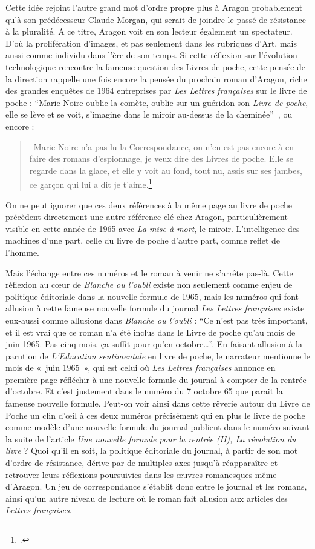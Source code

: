 	Cette idée rejoint l’autre grand mot d’ordre propre plus à Aragon probablement qu’à son prédécesseur Claude Morgan, qui serait de joindre le passé de résistance à la pluralité. A ce titre, Aragon voit en son lecteur également un spectateur. D’où la prolifération d’images, et pas seulement dans les rubriques d’Art, mais aussi comme individu dans l’ère de son temps. Si cette réflexion sur l’évolution technologique rencontre la fameuse question des Livres de poche, cette pensée de la direction rappelle une fois encore la pensée du prochain roman d’Aragon, riche des grandes enquêtes de 1964 entreprises par \emph{Les Lettres françaises} sur le livre de poche : \enquote{Marie Noire oublie la comète, oublie sur un guéridon son \emph{Livre de poche}, elle se lève et se voit, s’imagine dans le miroir au-dessus de la cheminée} , ou encore :
	\begin{quote}
	 Marie Noire n’a pas lu la Correspondance, on n’en est pas encore à en faire des romans d’espionnage, je veux dire des Livres de poche. Elle se regarde dans la glace, et elle y voit au fond, tout nu, assis sur ses jambes, ce garçon qui lui a dit je t’aime.\footcite[p102]{blancheouloubli}\end{quote}

	  On ne peut ignorer que ces deux références à la même page au livre de poche précèdent directement une autre référence-clé chez Aragon, particulièrement visible en cette année de 1965 avec \emph{La mise à mort}, le miroir. L’intelligence des machines d’une part, celle du livre de poche d’autre part, comme reflet de l’homme. 


Mais l’échange entre ces numéros et le roman à venir ne s’arrête pas-là. Cette réflexion au c\oe{}ur de \emph{Blanche ou l’oubli} existe non seulement comme enjeu de politique éditoriale dans la nouvelle formule de 1965, mais les numéros qui font allusion à cette fameuse nouvelle formule du journal \emph{Les Lettres françaises} existe eux-aussi comme allusions dans \emph{Blanche ou l’oubli} : \enquote{Ce n’est pas très important, et il est vrai que ce roman n’a été inclus dans le Livre de poche qu’au mois de juin 1965. Pas cinq mois. ça suffit pour qu’en octobre…}. En faisant allusion à la parution de \emph{L’Education sentimentale} en livre de poche, le narrateur mentionne le mois de « juin 1965 », qui est celui où \emph{Les Lettres françaises} annonce en première page réfléchir à une nouvelle formule du journal à compter de la rentrée d’octobre. Et c’est justement dans le numéro du 7 octobre 65 que parait la fameuse nouvelle formule. Peut-on voir ainsi dans cette rêverie autour du Livre de Poche un clin d’\oe{}il à ces deux numéros précisément qui en plus le livre de poche comme modèle d’une nouvelle formule du journal publient dans le numéro suivant la suite de l’article \emph{Une nouvelle formule pour la rentrée (II), La révolution du livre }? Quoi qu’il en soit, la politique éditoriale du journal, à partir de son mot d’ordre de résistance, dérive par de multiples axes jusqu’à réapparaître et retrouver leurs réflexions poursuivies dans les \oe{}uvres romanesques même d’Aragon. Un jeu de correspondance s’établit donc entre le journal et les romans, ainsi qu’un autre niveau de lecture où le roman fait allusion aux articles des \emph{Lettres françaises}. 


